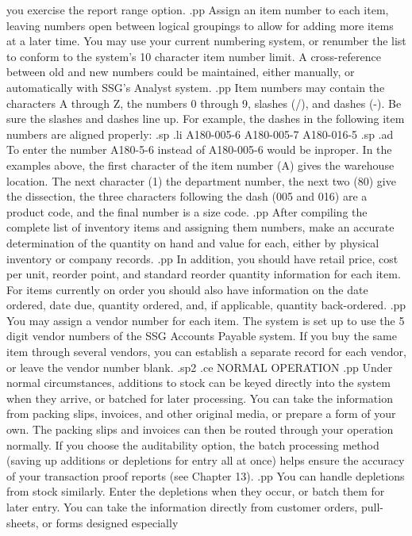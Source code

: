 you exercise the report range option.
.pp
Assign an item number to each item,
leaving numbers open between logical groupings
to allow for adding more items at a later time.
You may use your current numbering system,
or renumber the list to conform to the system's 10 character item number
limit.	A cross-reference between old and new numbers could be maintained,
either manually, or automatically with SSG's Analyst system.
.pp
Item numbers may contain the characters A through Z, the numbers 0 through
9, slashes (/), and dashes (-).  Be sure the slashes and dashes line up.
For example, the dashes in the following item numbers are aligned properly:
.sp
.li
	    A180-005-6
	    A180-005-7
	    A180-016-5
.sp
.ad
To enter the number A180-5-6 instead of A180-005-6 would be inproper.
In the examples above, the first character of the item number (A) gives
the warehouse location.  The next character (1) the department number,
the next two (80) give the dissection, the three characters following the
dash (005 and 016) are a product code, and the final number is a size code.
.pp
After compiling the complete list of inventory items and assigning
them numbers, make an accurate determination of the quantity on hand
and value for each, either by physical inventory or company records.
.pp
In addition, you should have retail price, cost per unit, reorder point,
and standard reorder quantity information for each item.  For items
currently on order you should also have information on the date ordered,
date due, quantity ordered, and, if applicable, quantity back-ordered.
.pp
You may assign a vendor number for each item.  The system is set up to
use the 5 digit vendor numbers of the SSG Accounts Payable system.  If
you buy the same item through several vendors, you can establish a
separate record for each vendor, or leave the vendor number blank.
.sp2
.ce
NORMAL OPERATION
.pp
Under normal circumstances, additions to stock can be keyed directly into
the system when they arrive, or batched for later processing.  You can
take the information  from packing slips, invoices, and other original
media, or prepare a form of your own. The packing slips and invoices
can then be routed through your operation normally.
If you choose the auditability option, the batch processing method (saving
up additions or depletions
for entry all at once) helps ensure the accuracy of your transaction
proof reports (see Chapter 13).
.pp
You can handle depletions from stock similarly.  Enter the depletions
when they occur, or batch them for later entry.  You can take the information
directly from customer orders, pull-sheets, or forms designed especially
